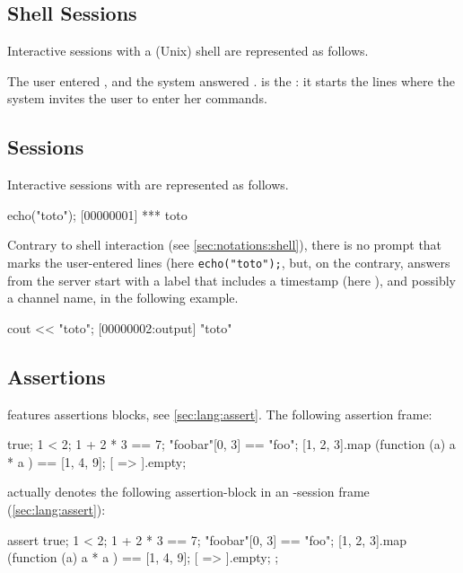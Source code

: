 \subsection{Shell Sessions}
\label{sec:notations:shell}

Interactive sessions with a (Unix) shell are represented as follows.


The user entered , and the system answered
.  \samp{\$} is the : it starts the lines where
the system invites the user to enter her commands.

\subsection{\us Sessions}
\label{sec:notations:us}

Interactive sessions with \urbi are represented as follows.

\begin{urbiscript}[firstnumber=1]
echo("toto");
[00000001] *** toto
\end{urbiscript}

Contrary to shell interaction (see \autoref{sec:notations:shell}),
there is no prompt that marks the user-entered lines (here
\lstinline|echo("toto");|, but, on the contrary, answers from the \urbi
server start with a label that includes a timestamp (here
), and possibly a channel name,  in the
following example.

\begin{urbiscript}
cout << "toto";
[00000002:output] "toto"
\end{urbiscript}


\subsection{\us Assertions}
\label{sec:notations:urbiassert}

\us features assertions blocks, see \autoref{sec:lang:assert}.  The
following assertion frame:

\begin{urbiassert}
true;
1 < 2;
1 + 2 * 3 == 7;
"foobar"[0, 3] == "foo";
[1, 2, 3].map (function (a) { a * a }) == [1, 4, 9];
[ => ].empty;
\end{urbiassert}

\noindent
actually denotes the following assertion-block in an \us-session
frame (\autoref{sec:lang:assert}):

\begin{urbiscript}
assert
{
  true;
  1 < 2;
  1 + 2 * 3 == 7;
  "foobar"[0, 3] == "foo";
  [1, 2, 3].map (function (a) { a * a }) == [1, 4, 9];
  [ => ].empty;
};
\end{urbiscript}


